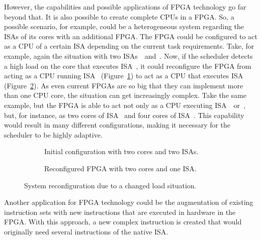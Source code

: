 However, the capabilities and possible applications of \ac{FPGA} technology go far beyond that. It is also possible to create complete \acp{CPU} in a \ac{FPGA}. So, a possible scenario, for example, could be a heterogeneous system regarding the \acp{ISA} of its cores with an additional \ac{FPGA}. The \ac{FPGA} could be configured to act as a CPU of a certain \ac{ISA} depending on the current task requirements. Take, for example, again the situation with two \acp{ISA}~\textalpha{}~and~\textbeta{}. Now, if the scheduler detects a high load on the core that executes \ac{ISA}~\textbeta{}, it could reconfigure the \ac{FPGA} from acting as a CPU running \ac{ISA}~\textalpha{} (Figure~\ref{fig:req:fpga1}) to act as a CPU that executes \ac{ISA}~\textbeta{} (Figure~\ref{fig:req:fpga2}). As even current \acp{FPGA} are so big that they can implement more than one CPU core, the situation can get increasingly complex. Take the same example, but the \ac{FPGA} is able to act not only as a CPU executing \ac{ISA}~\textalpha{}~or~\textbeta{}, but, for instance, as two cores of \ac{ISA}~\textalpha{} and four cores of \ac{ISA}~\textbeta{}. This capability would result in many different configurations, making it necessary for the scheduler to be highly adaptive.

\begin{figure*}[b!]
	\centering
	\begin{subfigure}[t]{0.48\textwidth}\centering
		\caption{Initial configuration with two cores and two ISAs.}%
		\label{fig:req:fpga1}
	\end{subfigure}
	\hfill
	\begin{subfigure}[t]{0.48\textwidth}\centering
		\caption{Reconfigured FPGA with two cores and one ISA.}%
		\label{fig:req:fpga2}
	\end{subfigure}%
	\caption{System reconfiguration due to a changed load situation.}%
	\label{fig:req:fpga}
\end{figure*}

Another application for \ac{FPGA} technology could be the augmentation of existing instruction sets with new instructions that are executed in hardware in the \ac{FPGA}. With this approach, a new complex instruction is created that would originally need several instructions of the native \ac{ISA}.



